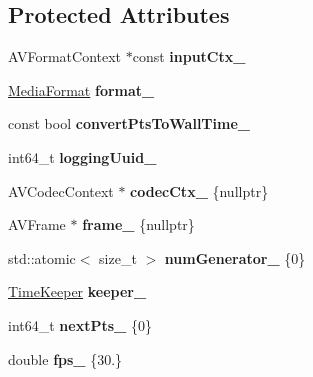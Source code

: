 \subsection*{Protected Attributes}
\begin{DoxyCompactItemize}
\item 
\mbox{\label{classffmpeg_1_1Stream_a11fecbb1b5ace36dfc3240ba5fca1a15}} 
A\+V\+Format\+Context $\ast$const {\bfseries input\+Ctx\+\_\+}
\item 
\mbox{\label{classffmpeg_1_1Stream_aabe918fedef14f18abd745dfd810ca3a}} 
\hyperlink{structffmpeg_1_1MediaFormat}{Media\+Format} {\bfseries format\+\_\+}
\item 
\mbox{\label{classffmpeg_1_1Stream_a16e7ff95ecfe7c9f59c9e1761704b5cb}} 
const bool {\bfseries convert\+Pts\+To\+Wall\+Time\+\_\+}
\item 
\mbox{\label{classffmpeg_1_1Stream_aceb3865ff7bb185f0462a6f47e7431a0}} 
int64\+\_\+t {\bfseries logging\+Uuid\+\_\+}
\item 
\mbox{\label{classffmpeg_1_1Stream_aae62027059eaf5fe34a19d5dc97eb6bb}} 
A\+V\+Codec\+Context $\ast$ {\bfseries codec\+Ctx\+\_\+} \{nullptr\}
\item 
\mbox{\label{classffmpeg_1_1Stream_a150f150edc4ddab30d562e5bd36194c8}} 
A\+V\+Frame $\ast$ {\bfseries frame\+\_\+} \{nullptr\}
\item 
\mbox{\label{classffmpeg_1_1Stream_a4e2f34cee1e6990bf218a473df291b14}} 
std\+::atomic$<$ size\+\_\+t $>$ {\bfseries num\+Generator\+\_\+} \{0\}
\item 
\mbox{\label{classffmpeg_1_1Stream_a331715344d5590587af60ee8d57dbc66}} 
\hyperlink{classffmpeg_1_1TimeKeeper}{Time\+Keeper} {\bfseries keeper\+\_\+}
\item 
\mbox{\label{classffmpeg_1_1Stream_a425ed39dcd100e11ef4246bc4e3b5bff}} 
int64\+\_\+t {\bfseries next\+Pts\+\_\+} \{0\}
\item 
\mbox{\label{classffmpeg_1_1Stream_a4416d3596de58216fdccced5317e19ed}} 
double {\bfseries fps\+\_\+} \{30.\}
\end{DoxyCompactItemize}


